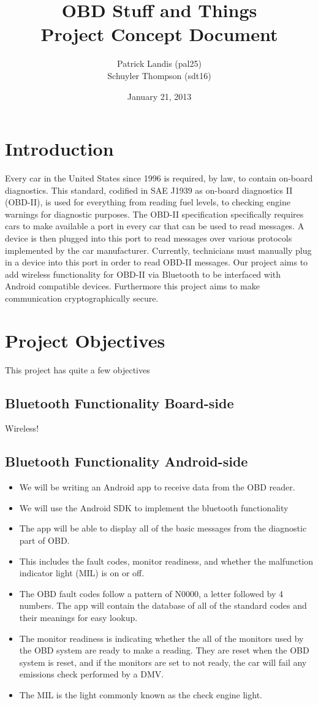 \documentclass[12pt,letterpaper]{article}
\title{
\textbf{\LARGE OBD Stuff and Things} \\
\Large Project Concept Document
}
\author{
\normalsize Patrick Landis (pal25) \\
\normalsize Schuyler Thompson (sdt16)
}
\date{\normalsize January 21, 2013}
\begin{document}
\maketitle

\section{Introduction}
Every car in the United States since 1996 is required, by law, to contain on-board diagnostics. This standard, codified in SAE J1939 as on-board diagnostics II (OBD-II), is used for everything from reading fuel levels, to checking engine warnings for diagnostic purposes. The OBD-II specification specifically requires cars to make available a port in every car that can be used to read messages. A device is then plugged into this port to read messages over various protocols implemented by the car manufacturer. Currently, technicians must manually plug in a device into this port in order to read OBD-II messages. Our project aims to add wireless functionality for OBD-II via Bluetooth to be interfaced with Android compatible devices. Furthermore this project aims to make communication cryptographically secure.


\section{Project Objectives}
This project has quite a few objectives

\subsection{Bluetooth Functionality Board-side}
Wireless!

\subsection{Bluetooth Functionality Android-side}
\begin{itemize}
	\item We will be writing an Android app to receive data from the OBD reader.
	\item We will use the Android SDK to implement the bluetooth functionality
	\item The app will be able to display all of the basic messages from the diagnostic part of OBD.
	\item This includes the fault codes, monitor readiness, and whether the malfunction indicator light (MIL) is on or off.
	\item The OBD fault codes follow a pattern of N0000, a letter followed by 4 numbers. The app will contain the database of all of the standard codes and their meanings for easy lookup. 
	\item  The monitor readiness is indicating whether the all of the monitors used by the OBD system are ready to make a reading. They are reset when the OBD system is reset, and if the monitors are set to not ready, the car will fail any emissions check performed by a DMV. 
	\item The MIL is the light commonly known as the check engine light. 
\end{itemize}
\end{document}
